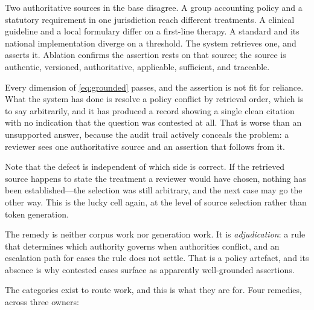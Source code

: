 Two authoritative sources in the base disagree. A group accounting policy and a
statutory requirement in one jurisdiction reach different treatments. A clinical
guideline and a local formulary differ on a first-line therapy. A standard and its
national implementation diverge on a threshold. The system retrieves one, and asserts
it. Ablation confirms the assertion rests on that source; the source is authentic,
versioned, authoritative, applicable, sufficient, and traceable.

Every dimension of \eqref{eq:grounded} passes, and the assertion is not fit for
reliance. What the system has done is resolve a policy conflict by retrieval order,
which is to say arbitrarily, and it has produced a record showing a single clean
citation with no indication that the question was contested at all. That is worse than
an unsupported answer, because the audit trail actively conceals the problem: a
reviewer sees one authoritative source and an assertion that follows from it.

Note that the defect is independent of which side is correct. If the retrieved source
happens to state the treatment a reviewer would have chosen, nothing has been
established---the selection was still arbitrary, and the next case may go the other
way. This is the lucky cell again, at the level of source selection rather than token
generation.

The remedy is neither corpus work nor generation work. It is \emph{adjudication}: a
rule that determines which authority governs when authorities conflict, and an
escalation path for cases the rule does not settle. That is a policy artefact, and its
absence is why contested cases surface as apparently well-grounded assertions.

The categories exist to route work, and this is what they are for. Four remedies,
across three owners:
\label{sec:remedies}

